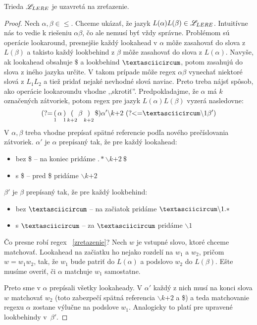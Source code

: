 \begin{veta}
Trieda $\mathscr{L}_{LERE}$ je uzavretá na zreťazenie.
\end{veta}
\begin{proof}
Nech $\alpha, \beta\in \le$. Chceme ukázať, že jazyk $L(\alpha)L(\beta) \in \mathscr{L}_{LERE}$. Intuitívne nás to vedie k riešeniu $\alpha\beta$, čo ale nemusí byť vždy správne. Problémom sú operácie lookaround, presnejšie každý lookahead v $\alpha$ môže zasahovať do slova z $L(\beta)$ a takisto každý lookbehind z $\beta$ môže zasahovať do slova z $L(\alpha)$. Navyše, ak lookahead obsahuje $\$$ a lookbehind $\textasciicircum$, potom zasahujú do slova z iného jazyka určite. V takom prípade môže regex $\alpha\beta$ vynechať niektoré slová z $L_1L_2$ a tiež pridať nejaké nevhodné slová naviac. Preto treba nájsť spôsob, ako operácie lookaroundu vhodne ,,skrotiť''. Predpokladajme, že $\alpha$ má $k$ označených zátvoriek, potom regex pre jazyk $L(\alpha)L(\beta)$ vyzerá nasledovne:
\begin{equation} \label{zretazenie}
\lookahead \mathop(_1 \alpha \mathop)_1 \mathop(_{k+2}\beta \mathop)_{k+2} \mathdollar) \alpha ' \backslash \text{$k$+2} ~\lookbehind \textasciicircum\backslash 1\beta ')
\end{equation}
V $\alpha,\beta$ treba vhodne prepísať spätné referencie podľa nového prečíslovania zátvoriek. $\alpha '$ je $\alpha$ prepísaný tak, že pre každý lookahead:
\begin{itemize}
\item bez \$ -- na koniec pridáme $.* \backslash \text{$k$+2} ~\mathdollar $
\item s \$ -- pred \$ pridáme $\backslash \text{$k$+2}$
\end{itemize}
$\beta '$ je $\beta$ prepísaný tak, že pre každý lookbehind:
\begin{itemize}
\item bez $\textasciicircum$ -- na začiatok pridáme $\textasciicircum \backslash 1.*$
\item s $\textasciicircum$ -- za $\textasciicircum$ pridáme $ \backslash 1$
\end{itemize}
Čo presne robí regex ~\ref{zretazenie}? Nech $w$ je vstupné slovo, ktoré chceme matchovať. Lookahead na začiatku ho nejako rozdelí na $w_1$ a $w_2$, pričom $w=w_1w_2$, tak, že $w_1$ bude patriť do $L(\alpha)$ a podslovo $w_2$ do $L(\beta)$. Ešte musíme overiť, či $\alpha$ matchuje $w_1$ samostatne.

Preto sme v $\alpha$ prepísali všetky lookaheady. V $\alpha '$ každý z nich musí na konci slova $w$ matchovať $w_2$ (toto zabezpečí spätná referencia $\backslash \text{$k$+2}$ a \$) a teda matchovanie regexu $\alpha$ zostane výlučne na podslove $w_1$. Analogicky to platí pre upravené lookbehindy v~$\beta '$.

\end{proof}

